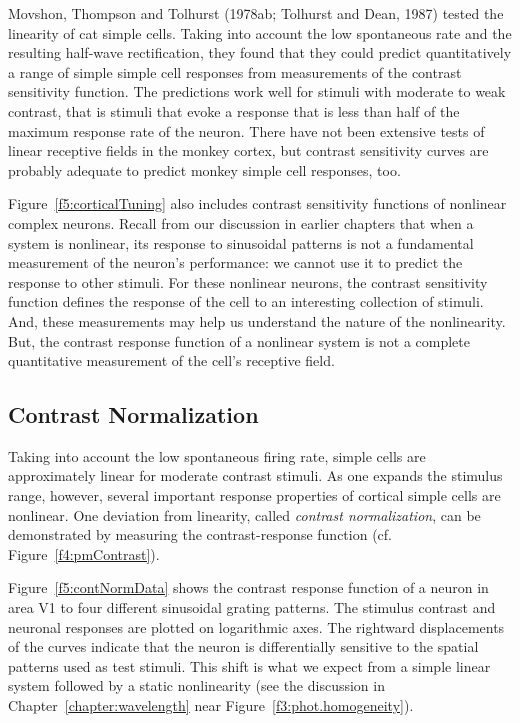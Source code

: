 Movshon, Thompson and Tolhurst (1978ab;  Tolhurst and Dean, 1987) tested
the linearity of cat simple cells.
Taking into account the low spontaneous rate and the
resulting half-wave rectification,
they found that they could
predict quantitatively a range of simple simple cell responses
from measurements of the contrast sensitivity function.
The predictions work well
for stimuli with moderate to weak contrast, that is stimuli
that evoke a response that is less than half of the maximum
response rate of the neuron.
There have not been extensive tests of linear receptive
fields in the monkey cortex, but contrast sensitivity curves
are probably adequate to predict monkey simple cell responses, too.

Figure~\ref{f5:corticalTuning} also includes contrast sensitivity
functions of nonlinear complex neurons.
Recall from our discussion in earlier chapters
that when a system is nonlinear,
its response to sinusoidal patterns
is not a fundamental measurement of the neuron's performance:
we cannot use it to predict the response to other stimuli.
For these nonlinear neurons,
the contrast sensitivity function
defines the response of the cell to an interesting
collection of stimuli.
And, these measurements may help us understand the nature
of the nonlinearity.
But, the contrast response
function of a nonlinear system
is not a complete quantitative measurement
of the cell's receptive field.

\subsection*{Contrast Normalization}
Taking into account the low spontaneous firing rate,
simple cells are approximately linear
for moderate contrast stimuli.
As one expands the stimulus range, however,
several important response properties of cortical simple
cells are nonlinear.
One deviation from linearity, called {\em contrast normalization},
can be demonstrated by measuring the contrast-response function
(cf. Figure~\ref{f4:pmContrast}).

Figure~\ref{f5:contNormData} shows
the contrast response function of a neuron in area V1 to four
different sinusoidal grating patterns.
The stimulus contrast and neuronal responses are plotted on
logarithmic axes.
The rightward displacements of the curves indicate that the
neuron is differentially sensitive to the spatial patterns
used as test stimuli.
This shift is what we expect from a simple linear system
followed by a static nonlinearity
(see the discussion in Chapter~\ref{chapter:wavelength}
near Figure~\ref{f3:phot.homogeneity}).


